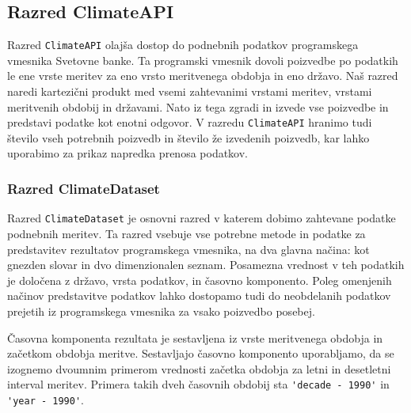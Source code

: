 % 
% 
% 


\subsection{Razred ClimateAPI}

Razred \verb|ClimateAPI| olajša dostop do podnebnih podatkov programskega
vmesnika Svetovne banke. Ta programski vmesnik dovoli poizvedbe po podatkih le 
ene vrste meritev za eno vrsto meritvenega obdobja in eno državo. Naš razred 
naredi kartezični produkt med vsemi zahtevanimi vrstami meritev, vrstami
meritvenih obdobij in državami. Nato iz tega zgradi in izvede vse poizvedbe 
in predstavi podatke kot enotni odgovor. V razredu \verb|ClimateAPI| hranimo 
tudi število vseh potrebnih poizvedb in število že izvedenih poizvedb, kar 
lahko uporabimo za prikaz napredka prenosa podatkov.



\subsubsection{Razred ClimateDataset}

Razred \verb|ClimateDataset| je osnovni razred v katerem dobimo zahtevane 
podatke podnebnih meritev. Ta razred vsebuje vse potrebne metode in podatke za 
predstavitev rezultatov programskega vmesnika, na dva glavna načina: kot
gnezden slovar in dvo dimenzionalen seznam. Posamezna vrednost v teh podatkih
je določena z državo, vrsta podatkov, in časovno komponento. Poleg omenjenih
načinov predstavitve podatkov lahko dostopamo tudi do neobdelanih podatkov 
prejetih iz programskega vmesnika za vsako poizvedbo posebej.

Časovna komponenta rezultata je sestavljena iz vrste meritvenega obdobja in 
začetkom obdobja meritve. Sestavljajo časovno komponento uporabljamo, da se 
izognemo dvoumnim primerom vrednosti začetka obdobja za letni in desetletni 
interval meritev. Primera takih dveh časovnih obdobij sta 
\verb|'decade - 1990'| in \verb|'year - 1990'|.


